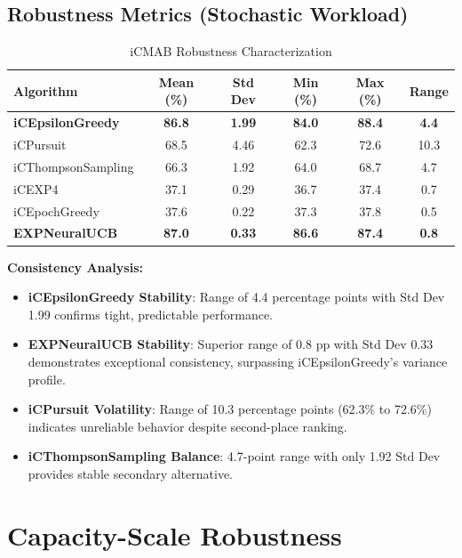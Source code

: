 \documentclass[12pt,a4paper]{article}
\newcommand{\secondarytext}[1]{\textcolor{secondaryblue}{\textbf{#1}}}
\newcommand{\success}[1]{\textcolor{accentgreen}{\textbf{#1}}}
\newcommand{\warning}[1]{\textcolor{warningred}{\textbf{#1}}}
\newcommand{\legacy}[1]{\textcolor{legacycolor}{\textbf{#1}}}
\begin{document}
\subsection{Robustness Metrics (Stochastic Workload)}

\begin{table}[H]
\centering
\caption{iCMAB Robustness Characterization}
\label{tab:robustness}
\begin{tabular}{@{}lccccc@{}}
\toprule
\textbf{Algorithm} & \textbf{Mean (\%)} & \textbf{Std Dev} & \textbf{Min (\%)} & \textbf{Max (\%)} & \textbf{Range} \\
\midrule
\success{iCEpsilonGreedy}   & \success{86.8} & \success{1.99} & \success{84.0} & \success{88.4} & \success{4.4} \\
iCPursuit                   & 68.5 & 4.46 & 62.3 & 72.6 & 10.3 \\
iCThompsonSampling          & 66.3 & 1.92 & 64.0 & 68.7 & 4.7 \\
iCEXP4                      & 37.1 & 0.29 & 36.7 & 37.4 & 0.7 \\
iCEpochGreedy               & 37.6 & 0.22 & 37.3 & 37.8 & 0.5 \\
\legacy{EXPNeuralUCB}       & \legacy{87.0} & \legacy{0.33} & \legacy{86.6} & \legacy{87.4} & \legacy{0.8} \\
\bottomrule
\end{tabular}
\end{table}

\textbf{Consistency Analysis:}
\begin{itemize}
\item \success{iCEpsilonGreedy Stability}: Range of 4.4 percentage points with Std Dev 1.99 confirms tight, predictable performance.
\item \legacy{EXPNeuralUCB Stability}: Superior range of 0.8 pp with Std Dev 0.33 demonstrates exceptional consistency, surpassing iCEpsilonGreedy's variance profile.
\item \warning{iCPursuit Volatility}: Range of 10.3 percentage points (62.3\% to 72.6\%) indicates unreliable behavior despite second-place ranking.
\item \secondarytext{iCThompsonSampling Balance}: 4.7-point range with only 1.92 Std Dev provides stable secondary alternative.
\end{itemize}

\section{Capacity-Scale Robustness}
\end{document}
